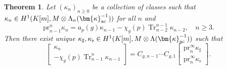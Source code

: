 \documentclass{amsart}
\numberwithin{equation}{section}
\newtheorem{theorem}{Theorem}[section]
\newcommand{\pr}{\mathrm{pr}}
\newcommand{\Tr}{\operatorname{Tr}}
\newcommand{\ac}{\textup{ac}}
\newcommand{\bk}{(\bm{\kappa}_{\ac}^{-1})}
\begin{document}
\begin{theorem}\label{thm:generic-decomposition}
  Let $(\kappa_n)_{n\ge 0}$ be a collection of classes such that $\kappa_n\in H^1(K[m],M\otimes\Lambda_n\bk)$ for all $n$ and
    \begin{equation}
    \pr^n_{n-1}\kappa_n=a_p(g)\kappa_{n-1}-\chi_g(p)\Tr_{n-2}^{n-1}\kappa_{n-2},\quad n\ge3.    \label{eq:trace-relation}
    \end{equation}
       Then there exist unique $\kappa_\sharp,\kappa_\flat\in H^1(K[m],M\otimes\Lambda\bk)$ such that
    \[
    \begin{bmatrix}
        \kappa_n\\-\chi_g(p)\Tr_{n-1}^n\kappa_{n-1}
    \end{bmatrix}
    =C_{g,n-1}\cdots C_{g,1}\begin{bmatrix}
        \pr^\infty_n \kappa_\sharp\\\pr^\infty_n \kappa_\flat
    \end{bmatrix}.
    \]\end{theorem}
\end{document}
